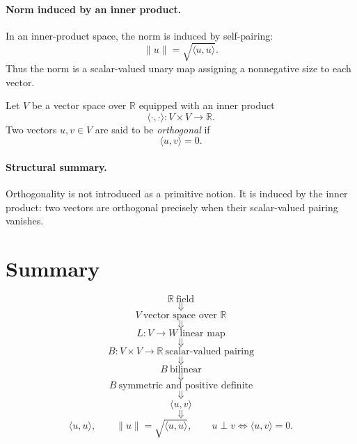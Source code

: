\documentclass{article}
\begin{document}
\paragraph{Norm induced by an inner product.}
In an inner-product space, the norm is induced by self-pairing:
$$
\|u\|=\sqrt{\langle u,u\rangle}.
$$
Thus the norm is a scalar-valued unary map assigning a nonnegative size to each vector.

\begin{definition}[Orthogonality]
Let $V$ be a vector space over $\mathbb{R}$ equipped with an inner product
$$
\langle\cdot,\cdot\rangle:V\times V\to\mathbb{R}.
$$
Two vectors $u,v\in V$ are said to be \emph{orthogonal} if
$$
\langle u,v\rangle=0.
$$
\end{definition}

\paragraph{Structural summary.}
Orthogonality is not introduced as a primitive notion. It is induced by the inner product: two vectors are orthogonal precisely when their scalar-valued pairing vanishes.

\section{Summary}

$$
\mathbb{R}\ \text{field}
$$
$$
\Downarrow
$$
$$
V\ \text{vector space over }\mathbb{R}
$$
$$
\Downarrow
$$
$$
L:V\to W\ \text{linear map}
$$
$$
\Downarrow
$$
$$
B:V\times V\to\mathbb{R}\ \text{scalar-valued pairing}
$$
$$
\Downarrow
$$
$$
B\ \text{bilinear}
$$
$$
\Downarrow
$$
$$
B\ \text{symmetric and positive definite}
$$
$$
\Downarrow
$$
$$
\langle u,v\rangle
$$
$$
\Downarrow
$$
$$
\langle u,u\rangle,
\qquad
\|u\|=\sqrt{\langle u,u\rangle},
\qquad
u\perp v\iff \langle u,v\rangle=0.
$$
\end{document}
